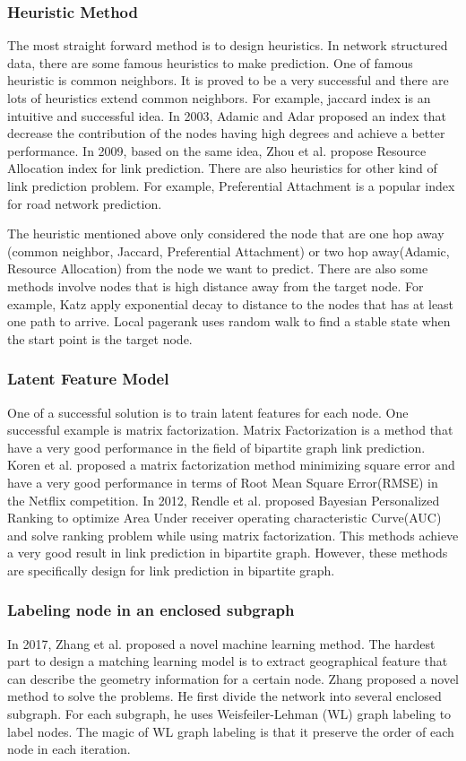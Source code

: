 \documentclass[paper=letter, fontsize=12pt]{scrartcl} %
\begin{document}
\subsubsection{Heuristic Method}
The most straight forward method is to design heuristics.
In network structured data, there are some famous heuristics to make prediction. One of famous heuristic is common neighbors. It is proved to be a very successful and there are lots of heuristics extend common neighbors. For example, jaccard index is an intuitive and successful idea. In 2003, Adamic and Adar \cite{adar} proposed an index that decrease the contribution of the nodes having high degrees and achieve a better performance. In 2009, based on the same idea, Zhou et al. \cite{ra} propose Resource Allocation index for link prediction. There are also heuristics for other kind of link prediction problem. For example, Preferential Attachment \cite{pa} is a popular index for road network prediction.

The heuristic mentioned above only considered the node that are one hop away (common neighbor, Jaccard, Preferential Attachment) or two hop away(Adamic, Resource Allocation) from the node we want to predict. There are also some methods involve nodes that is high distance away from the target node. For example, Katz \cite{katz} apply exponential decay to distance to the nodes that has at least one path to arrive. Local pagerank uses random walk to find a stable state when the start point is the target node.  

\subsubsection {Latent Feature Model}
One of a successful solution is to train latent features for each node. One successful example is matrix factorization. Matrix Factorization is a method that have a very good performance in the field of bipartite graph link prediction. Koren et al. proposed a matrix factorization \cite{mf} method minimizing square error and have a very good performance in terms of Root Mean Square Error(RMSE) in the Netflix competition. In 2012, Rendle et al. \cite{bprmf} proposed Bayesian Personalized Ranking to optimize Area Under receiver operating characteristic Curve(AUC) and solve ranking problem while using matrix factorization. This methods achieve a very good result in link prediction in bipartite graph. However, these methods are specifically design for link prediction in bipartite graph. 

\subsubsection {Labeling node in an enclosed subgraph}
In 2017, Zhang et al. proposed a novel machine learning method. The hardest part to design a matching learning model is to extract geographical feature that can describe the geometry information for a certain node. Zhang proposed a novel method to solve the problems. He first divide the network into several enclosed subgraph. For each subgraph, he uses Weisfeiler-Lehman (WL) graph labeling to label nodes. The magic of WL graph labeling is that it preserve the order of each node in each iteration.
\end{document}
